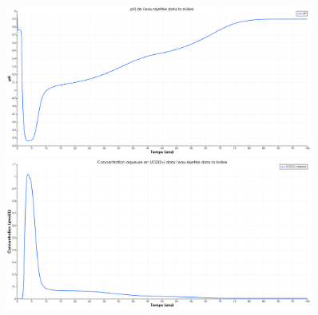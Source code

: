 \documentclass{article}
\begin{document}
\begin{figure}[H]
    \centering
    \begin{minipage}{0.5\textwidth}
        \centering
        \includegraphics[width=0.9\textwidth]{III_B_2_5.png} 
        \caption{}
        \label{fig:pH_sable_Base}
    \end{minipage}\hfill
    \begin{minipage}{0.5\textwidth}
        \centering
        \includegraphics[width=0.9\textwidth]{III_B_2_6.png} 
        \caption{}
        \label{fig:UO2_riviere_sable_base}
    \end{minipage}
\end{figure}
\end{document}
